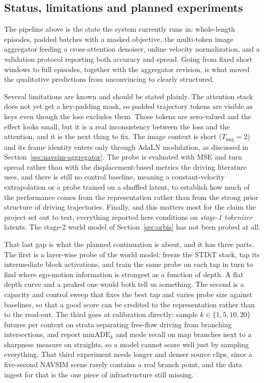 \subsection{Status, limitations and planned experiments}
\label{sec:navsim-status}

The pipeline above is the state the system currently runs in: whole-length
episodes, padded batches with a masked objective, the multi-token image
aggregator feeding a cross-attention denoiser, online velocity normalization, and
a validation protocol reporting both accuracy and spread. Going from fixed short
windows to full episodes, together with the aggregator revision, is what moved
the qualitative predictions from unconvincing to clearly structured.

Several limitations are known and should be stated plainly. The attention stack
does not yet get a key-padding mask, so padded trajectory tokens are visible as
keys even though the loss excludes them. Those tokens are zero-valued and the
effect looks small, but it is a real inconsistency between the loss and the
attention, and it is the next thing to fix. The image context is short
($T_{\text{img}}=2$) and its frame identity enters only through AdaLN modulation,
as discussed in Section~\ref{sec:navsim-aggregator}. The probe is evaluated with
MSE and turn spread rather than with the displacement-based metrics the driving
literature uses, and there is still no control baseline, meaning a
constant-velocity extrapolation or a probe trained on a shuffled latent, to
establish how much of the performance comes from the representation rather than
from the strong prior structure of driving trajectories. Finally, and this
matters most for the claim the project set out to test, everything reported here
conditions on \emph{stage-1 tokenizer} latents. The stage-2 world model of
Section~\ref{sec:orbis} has not been probed at all.

That last gap is what the planned continuation is about, and it has three parts.
The first is a layer-wise probe of the world model: freeze the STDiT stack, tap
its intermediate block activations, and train the same probe on each tap in turn
to find where ego-motion information is strongest as a function of depth. A flat
depth curve and a peaked one would both tell us something. The second is a
capacity and control sweep that fixes the best tap and varies probe size against
baselines, so that a good score can be credited to the representation rather than
to the read-out. The third goes at calibration directly: sample
$k\in\{1,5,10,20\}$ futures per context on strata separating free-flow driving
from branching intersections, and report $\text{minADE}_k$ and mode recall on map
branches next to a sharpness measure on straights, so a model cannot score well
just by sampling everything. That third experiment needs longer and denser source
clips, since a five-second NAVSIM scene rarely contains a real branch point, and
the data ingest for that is the one piece of infrastructure still missing.
